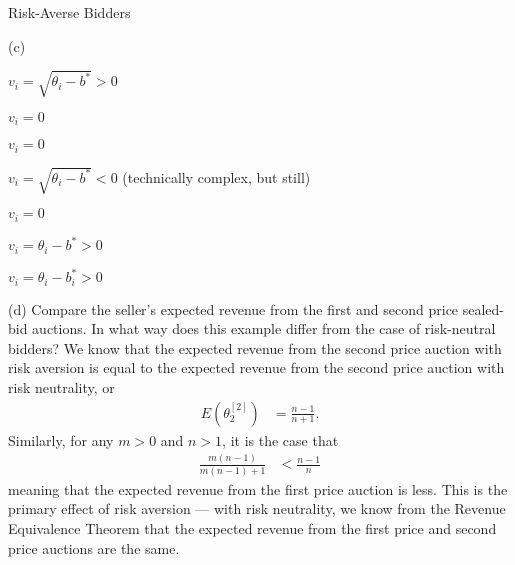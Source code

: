 \documentclass[9pt]{extarticle}
\begin{document}
\begin{problem}{Risk-Averse Bidders}
\begin{problem}{(c)}
\begin{description}[font=\normalfont]
\begin{description}[font=\normalfont]
            \item[Deviate to $\theta_i$:] $v_i = \sqrt{\theta_i - b^*} > 0$
          \end{description}
      \item[$\theta_i < b_i < b^*$:]\hfill
        \begin{description}[font=\normalfont]
          \item[Follow:] $v_i = 0$
          \item[Deviate to $\theta_i$:] $v_i = 0$
        \end{description}
      \item[$\theta_i < b^*< b_i$:]\hfill
        \begin{description}[font=\normalfont]
          \item[Follow:] $v_i = \sqrt{\theta_i - b^*} < 0$ (technically complex, but still)
          \item[Deviate to $\theta_i$:] $v_i = 0$
        \end{description}
      \item[$ b^*<\theta_i < b_i$:]\hfill
        \begin{description}[font=\normalfont]
          \item[Follow:] $v_i = \theta_i - b^* > 0$
          \item[Deviate to $\theta_i$:] $v_i = \theta_i - b_i^* > 0$
        \end{description}
      \end{description}
    \end{problem}
    \begin{problem}{(d)}
      Compare the seller's expected revenue from the first and second price sealed-bid auctions. In what way does this example differ from the case of risk-neutral bidders?
      \tcblower
      We know that the expected revenue from the second price auction with risk aversion is equal to the expected revenue from the second price auction with risk neutrality, or
      \begin{align*}
        E(\theta_2^{[2]}) &= \frac{n-1}{n+1}.
      \end{align*}
      Similarly, for any $m > 0$ and $n > 1$, it is the case that
      \begin{align*}
        \frac{m(n-1)}{m(n-1) + 1} &< \frac{n-1}{n}
      \end{align*}
      meaning that the expected revenue from the first price auction is less. This is the primary effect of risk aversion --- with risk neutrality, we know from the Revenue Equivalence Theorem that the expected revenue from the first price and second price auctions are the same.
    \end{problem}
  \end{problem}
\end{document}
